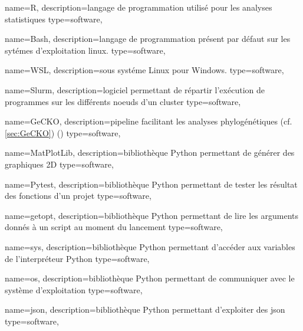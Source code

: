  {
    name=R,
    description={langage de programmation utilisé pour les analyses statistiques \cite{r}}
     type=software,
}

 {
    name=Bash,
    description={langage de programmation présent par défaut sur les sytémes d'exploitation linux. \cite{bash}}
     type=software,
}


 {
    name=WSL,
    description={sous systéme Linux pour Windows. \cite{wsl}}
     type=software,
}

 {
    name=Slurm,
    description={logiciel permettant de répartir l'exécution de programmes sur les différents noeuds d'un \gls{cluster} \cite{slurm}}
    type=software,
}
\newcommand{\Slurm}{\gls{Slurm}}

 {
    name=GeCKO,
    description={pipeline facilitant les analyses phylogénétiques (cf. \cref{sec:GeCKO}) (\cite{ardisson_gecko_2024})}
     type=software,
}
\newcommand{\GeCKO}{\gls{GeCKO}}


 {
    name=MatPlotLib,
    description={bibliothèque \gls{Python} permettant de générer des graphiques 2D \cite{matplotlib}}
     type=software,
}
\newcommand{\MatPlotLib}{\gls{MatPlotLib}}

 {
    name=Pytest,
    description={bibliothèque \gls{Python} permettant de tester les résultat des fonctions d'un projet \cite{pytest}}
     type=software,
}
\newcommand{\Pytest}{\gls{Pytest}}
\newcommand{\pytest}{\gls{Pytest}}


\newcommand{\bashrc}{"\gls{bashrc}"}



 {
    name=getopt,
    description={bibliothèque \gls{Python} permettant de lire les arguments donnés à un script au moment du lancement \cite{getopt}}
     type=software,
}
\newcommand{\getopts}{\gls{getopts}}

 {
    name=sys,
    description={bibliothèque \gls{Python} permettant d'accéder aux variables de l'interpréteur \gls{Python} \cite{sys}}
     type=software,
}

 {
    name=os,
    description={bibliothèque \gls{Python} permettant de communiquer avec le système d'exploitation \cite{os}}
     type=software,
}

 {
    name=json,
    description={bibliothèque \gls{Python} permettant d'exploiter des \gls{json} \cite{json}}
    type=software,
}






